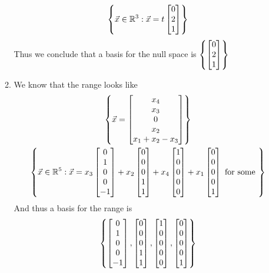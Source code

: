 \documentclass[11pt]{book}
\begin{document}
\begin{ex}
\begin{itemize}
\begin{enumerate}
\begin{gather*}
                    \left\{ \vec{x} \in \mathbb{R}^3: \vec{x} = t\begin{bmatrix} 0 \\ 2 \\ 1 \end{bmatrix} \right\}
                \end{gather*}
                Thus we conclude that a basis for the null space is  $\left\{ \begin{bmatrix} 0 \\ 2 \\ 1 \end{bmatrix} \right\}$ 
                \item We know that the range looks like
                \begin{gather*}
                    \left\{ \vec{x} = \begin{bmatrix} x_4 \\ x_3 \\ 0 \\ x_2 \\ x_1 + x_2 - x_3  \end{bmatrix} \right\}\\
                    \left\{ \vec{x} \in \mathbb{R}^{5}: \vec{x} = x_{3} \begin{bmatrix} 0 \\ 1 \\ 0 \\ 0 \\ -1 \end{bmatrix} + x_2 \begin{bmatrix} 0 \\ 0 \\ 0 \\ 1 \\ 1 \end{bmatrix} + x_4\begin{bmatrix} 1 \\ 0 \\ 0 \\ 0 \\ 0 \end{bmatrix} + x_1 \begin{bmatrix} 0 \\ 0 \\ 0 \\ 0 \\ 1 \end{bmatrix} \text{ for some  }\right\}
                \end{gather*}
                And thus a basis for the range is 
                \[
                \left\{ \begin{bmatrix} 0 \\ 1 \\ 0 \\ 0 \\ -1 \end{bmatrix}, \begin{bmatrix} 0 \\ 0 \\ 0 \\ 1 \\ 1 \end{bmatrix}, \begin{bmatrix} 1 \\ 0 \\ 0 \\ 0 \\ 0 \end{bmatrix}, \begin{bmatrix} 0 \\ 0 \\ 0 \\ 0 \\ 1 \end{bmatrix} \right\}
\]
\end{enumerate}
\end{itemize}
\end{ex}
\end{document}
